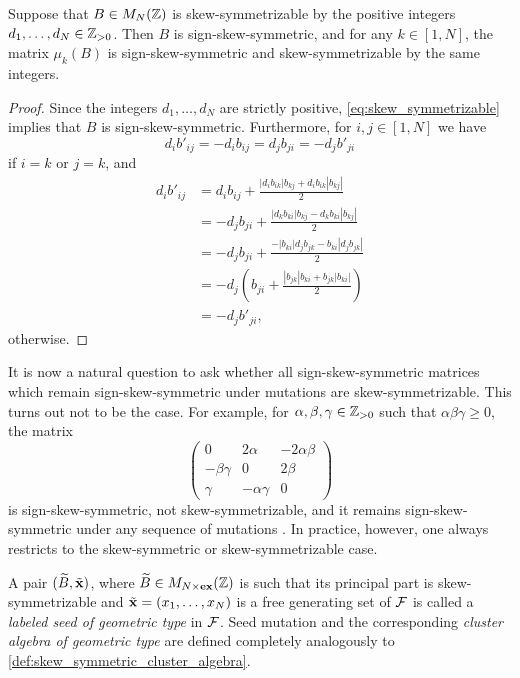 \begin{proposition}\label{prop:mutation_preserves_skew_symmetrizable}
	Suppose that $B \in M_N(\mathbb{Z})$ is skew-symmetrizable by the positive integers $d_1, \dots, d_N \in \mathbb{Z}_{>0}$. Then $B$ is sign-skew-symmetric, and for any $k \in [1, N]$, the matrix $\mu_k(B)$ is sign-skew-symmetric and skew-symmetrizable by the same integers.
\end{proposition}
\begin{proof}
	Since the integers $d_1, \dots, d_N$ are strictly positive, \cref{eq:skew_symmetrizable} implies that $B$ is sign-skew-symmetric. Furthermore, for $i,j \in [1, N]$ we have
	\begin{equation*}
		d_i b'_{ij} = - d_i  b_{ij} = d_j b_{ji} = -d_j b'_{ji}
	\end{equation*}
	if $i =k$ or $j = k$, and
	\begin{align*}
		d_i b'_{ij}
		 & = d_i b_{ij} + \frac{|d_i b_{ik}|b_{kj} + d_i b_{ik}|b_{kj}|}{2}         \\
		 & = - d_j b_{ji} + \frac{|d_k b_{ki}|b_{kj} - d_k b_{ki}|b_{kj}|}{2}       \\
		 & = - d_j b_{ji} + \frac{ - |b_{ki}| d_j b_{jk} - b_{ki}|d_jb_{jk}|}{2}    \\
		 & = - d_j\left( b_{ji} + \frac{|b_{jk}|b_{ki} +  b_{jk}|b_{ki}|}{2}\right) \\
		 & = - d_jb'_{ji},
	\end{align*}
	otherwise.
\end{proof}

It is now a natural question to ask whether all sign-skew-symmetric matrices which
remain sign-skew-symmetric under mutations are skew-symmetrizable. This turns out not
to be the case. For example, for $\alpha, \beta, \gamma \in \mathbb{Z}_{>0}$ such that
$\alpha\beta\gamma \geq 0$, the matrix
\begin{equation*}
	\begin{pmatrix}
		0             & 2\alpha         & -2\alpha \beta \\
		-\beta \gamma & 0               & 2 \beta        \\
		\gamma        & - \alpha \gamma & 0
	\end{pmatrix}
\end{equation*}
%
is sign-skew-symmetric, not skew-symmetrizable, and it remains sign-skew-symmetric
under any sequence of mutations \parencite[Proposition 4.7]{FominZelevinsky2002CAF}. In practice, however, one always
restricts to the skew-symmetric or skew-symmetrizable case.
\begin{definition}\label{def:cluster_algebra_geometric_type}

	A pair $(\widetilde{B}, \tilde{\mathbf{x}})$, where $\widetilde{B} \in M_{N \times \mathbf{ex}}(\mathbb{Z})$ is such that its principal
	part is skew-symmetrizable and $\tilde{\mathbf{x}} = (x_1, \dots, x_N)$ is a free generating set of
	$\mathcal{F}$ is called a \emph{labeled seed of geometric type}
	in $\mathcal{F}$. Seed mutation and the corresponding \emph{cluster algebra of geometric
		type} are defined completely analogously to \cref{def:skew_symmetric_cluster_algebra}.
\end{definition}

